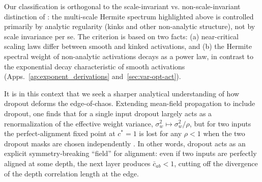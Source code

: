 \documentclass{article}
\theoremstyle{plain}
\theoremstyle{definition}
\theoremstyle{remark}
\begin{document}
Our classification is orthogonal to the scale-invariant vs. non-scale-invariant distinction of \cite{roberts2022principlesdeeplearningtheory}: the multi-scale Hermite spectrum highlighted above is controlled primarily by analytic regularity (kinks and other non-analytic structure), not by scale invariance per se. The criterion is based on two facts: (a) near-critical scaling laws differ between smooth and kinked activations, and (b) the Hermite spectral weight of non-analytic activations decays as a power law, in contrast to the exponential decay characteristic of smooth activations (Apps.~\ref{ap:exponent_derivations} and~\ref{sec:var-opt-act}).

It is in this context that we seek a sharper analytical understanding of how dropout deforms the edge-of-chaos. Extending mean-field propagation to include dropout, one finds that for a single input dropout largely acts as a renormalization of the effective weight variance, $\sigma_w^2\mapsto \sigma_w^2/\rho$, but for two inputs the perfect-alignment fixed point at $c^*=1$ is lost for any $\rho<1$ when the two dropout masks are chosen independently \cite{schoenholz2017deepinformationpropagation}. In other words, dropout acts as an explicit symmetry-breaking ``field'' for alignment: even if two inputs are perfectly aligned at some depth, the next layer produces $\bar c_{ab}<1$, cutting off the divergence of the depth correlation length at the edge.
\end{document}

